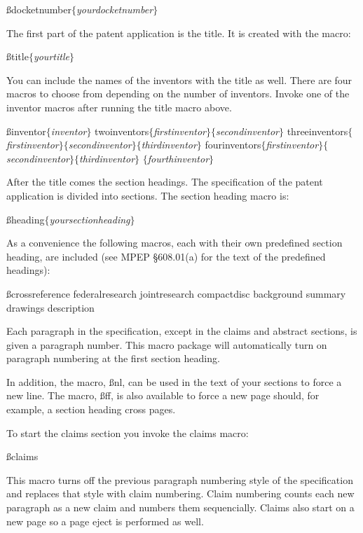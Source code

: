 \ss\bs docketnumber$\{${\it yourdocketnumber}$\}$
\rm

The first part of the patent application is the title.  It is created
with the macro:

\ss\bs title$\{${\it yourtitle}$\}$
\rm

You can include the names of the inventors with the title as well.
There are four macros to choose from depending on the number of
inventors.  Invoke one of the inventor macros after running the title
macro above.

          \ss\bs inventor$\{${\it inventor}$\}$\nl
\indent   \bs twoinventors$\{${\it firstinventor}$\}$$\{${\it secondinventor}$\}$\nl
\indent   \bs threeinventors$\{${\it firstinventor}$\}$$\{${\it secondinventor}$\}$$\{${\it thirdinventor}$\}$\nl
\indent   \bs fourinventors$\{${\it firstinventor}$\}$$\{${\it secondinventor}$\}$$\{${\it thirdinventor}$\}$\nl
\indent\indent $\{${\it fourthinventor}$\}$
          \rm

After the title comes the section headings.  The specification of the
patent application is divided into sections. The section heading macro is:

\ss\bs heading$\{${\it yoursectionheading}$\}$
\rm

As a convenience the following macros, each with their own predefined
section heading, are included (see MPEP \S608.01(a) for the text of
the predefined headings):

\indent   \ss\bs crossreference\nl
\indent   \bs federalresearch\nl
\indent   \bs jointresearch\nl
\indent   \bs compactdisc\nl
\indent   \bs background\nl
\indent   \bs summary\nl
\indent   \bs drawings\nl
\indent   \bs description
          \rm

Each paragraph in the specification, except in the claims and abstract
sections, is given a paragraph number.  This macro package will
automatically turn on paragraph numbering at the first section
heading.

In addition, the macro, \ss\bs nl\rm, can be used in the text of your sections to
force a new line.  The macro, \ss\bs ff\rm, is also available to force
a new page should, for example, a section heading cross pages.


To start the claims section you invoke the claims macro:

\ss\bs claims
\rm

This macro turns off the previous paragraph numbering style of the
specification and replaces that style with claim numbering.  Claim
numbering counts each new paragraph as a new claim and numbers them
sequencially.  Claims also start on a new page so a page eject is
performed as well.

